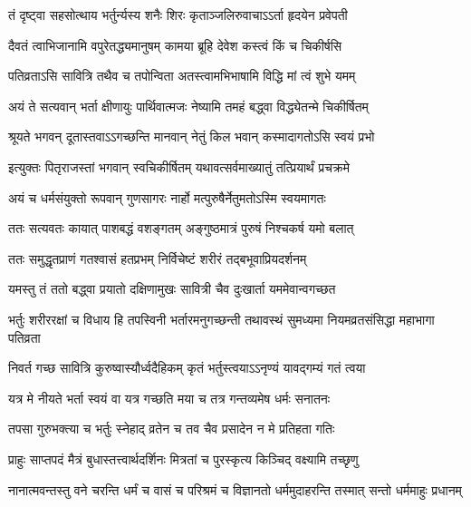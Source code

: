 \begin{center}
\twolineshloka
{तं दृष्ट्वा सहसोत्थाय भर्तुर्न्यस्य शनैः शिरः}
{कृताञ्जलिरुवाचाऽऽर्ता हृदयेन प्रवेपती}

\twolineshloka
{दैवतं त्वाभिजानामि वपुरेतद्ध्यमानुषम्}
{कामया ब्रूहि देवेश कस्त्वं किं च चिकीर्षसि}


\twolineshloka
{पतिव्रताऽसि सावित्रि तथैव च तपोन्विता}
{अतस्त्वामभिभाषामि विद्धि मां त्वं शुभे यमम्}

\twolineshloka
{अयं ते सत्यवान् भर्ता क्षीणायुः पार्थिवात्मजः}
{नेष्यामि तमहं बद्ध्वा विद्ध्येतन्मे चिकीर्षितम्}


\twolineshloka
{श्रूयते भगवन् दूतास्तवाऽऽगच्छन्ति मानवान्}
{नेतुं किल भवान् कस्मादागतोऽसि स्वयं प्रभो}


\twolineshloka
{इत्युक्तः पितृराजस्तां भगवान् स्वचिकीर्षितम्}
{यथावत्सर्वमाख्यातुं तत्प्रियार्थं प्रचक्रमे}

\twolineshloka
{अयं च धर्मसंयुक्तो रूपवान् गुणसागरः}
{नार्हो मत्पुरुषैर्नेतुमतोऽस्मि स्वयमागतः}

\twolineshloka
{ततः सत्यवतः कायात् पाशबद्धं वशङ्गतम्}
{अङ्गुष्ठमात्रं पुरुषं निश्चकर्ष यमो बलात्}

\twolineshloka
{ततः समुद्धृतप्राणं गतश्वासं हतप्रभम्}
{निर्विचेष्टं शरीरं तद्बभूवाप्रियदर्शनम्}

\twolineshloka
{यमस्तु तं ततो बद्ध्वा प्रयातो दक्षिणामुखः}
{सावित्री चैव दुःखार्ता यममेवान्वगच्छत}

\threelineshloka
{भर्तुः शरीररक्षां च विधाय हि तपस्विनी}
{भर्तारमनुगच्छन्ती  तथावस्थं सुमध्यमा}
{नियमव्रतसंसिद्धा महाभागा पतिव्रता}


\twolineshloka
{निवर्त गच्छ सावित्रि कुरुष्वास्यौर्ध्वदैहिकम्}
{कृतं भर्तुस्त्वयाऽऽनृण्यं यावद्गम्यं गतं त्वया}


\twolineshloka
{यत्र मे नीयते भर्ता स्वयं वा यत्र गच्छति}
{मया च तत्र गन्तव्यमेष धर्मः सनातनः}

\twolineshloka
{तपसा गुरुभक्त्या च भर्तुः स्नेहाद् व्रतेन च}
{तव चैव प्रसादेन न मे प्रतिहता गतिः}

\twolineshloka
{प्राहुः साप्तपदं मैत्रं बुधास्तत्त्वार्थदर्शिनः}
{मित्रतां च पुरस्कृत्य किञ्चिद् वक्ष्यामि तच्छृणु}

\fourlineindentedshloka
{नानात्मवन्तस्तु वने चरन्ति}
{धर्मं च वासं च परिश्रमं च}
{विज्ञानतो धर्ममुदाहरन्ति}
{तस्मात् सन्तो धर्ममाहुः प्रधानम्}


\end{center}
